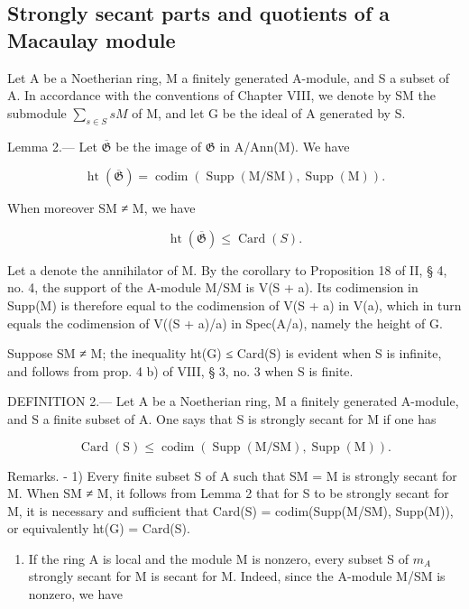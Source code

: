 \subsection{Strongly secant parts and quotients of a Macaulay module}

Let A be a Noetherian ring, M a finitely generated A-module, and S a subset of A. In accordance with the conventions of Chapter VIII, we denote by SM the submodule \(\sum_{s\in S}sM\) of M, and let G be the ideal of A generated by S.

Lemma 2.--- Let \(\overline{\mathfrak{G}}\) be the image of \(\mathfrak{G}\) in A/Ann(M). We have

\[
\operatorname{ht} (\overline {{\mathfrak {G}}}) = \operatorname{codim} (\operatorname{Supp} (\mathrm{M} / \mathrm{SM}), \operatorname{Supp} (\mathrm{M})) .
\]

When moreover SM ≠ M, we have

\[
\operatorname{ht} (\overline {{{\mathfrak {G}}}}) \leqslant \operatorname{Card} (S).
\]

Let a denote the annihilator of M. By the corollary to Proposition 18 of II, § 4, no. 4, the support of the A-module M/SM is V(S + a). Its codimension in Supp(M) is therefore equal to the codimension of V(S + a) in V(a), which in turn equals the codimension of V((S + a)/a) in Spec(A/a), namely the height of G.

Suppose SM ≠ M; the inequality ht(G) ≤ Card(S) is evident when S is infinite, and follows from prop. 4 b) of VIII, § 3, no. 3 when S is finite.

DEFINITION 2.--- Let A be a Noetherian ring, M a finitely generated A-module, and S a finite subset of A. One says that S is strongly secant for M if one has

\[
\operatorname{Card} (\mathrm{S}) \leqslant \operatorname{codim} (\operatorname{Supp} (\mathrm{M} / \mathrm{SM}), \operatorname{Supp} (\mathrm{M})) .
\]

Remarks. - 1) Every finite subset S of A such that SM = M is strongly secant for M. When SM ≠ M, it follows from Lemma 2 that for S to be strongly secant for M, it is necessary and sufficient that Card(S) = codim(Supp(M/SM), Supp(M)), or equivalently ht(G) = Card(S).

\begin{enumerate}
\def\labelenumi{\arabic{enumi})}
\setcounter{enumi}{1}
\tightlist
\item
  If the ring A is local and the module M is nonzero, every subset S of \(m_{A}\) strongly secant for M is secant for M. Indeed, since the A-module M/SM is nonzero, we have
\end{enumerate}

